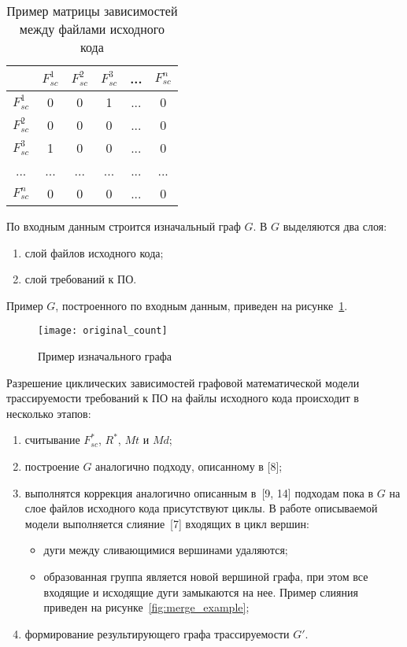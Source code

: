 \begin{longtable}{|c|c|c|c|c|c|}
\caption{Пример матрицы зависимостей между файлами исходного кода}
\label{tab:dependency_matrix}\\
\hline
& \cellcolor{platinum} $F_{sc}^1$ 
& \cellcolor{platinum} $F_{sc}^2$ 
& \cellcolor{platinum} $F_{sc}^3$ 
& ... 
& \cellcolor{platinum} $F_{sc}^n$ \\
\hline
\cellcolor{platinum} $F_{sc}^1$ & 0 & 0 & \cellcolor{light-blue} 1 & ... & 0 \\
\hline
\cellcolor{platinum} $F_{sc}^2$ & 0 & 0 & 0 & ... & 0 \\
\hline
\cellcolor{platinum} $F_{sc}^3$ & \cellcolor{mauve} 1 & 0 & 0 & ... & 0 \\
\hline
... & ... & ... & ... & ... & ... \\
\hline
\cellcolor{platinum} $F_{sc}^n $ & 0 & 0 & 0 & ... & 0 \\
\hline
\end{longtable}

По входным данным строится изначальный граф $G$. В $G$ выделяются два слоя:
\begin{enumerate}
    \item слой файлов исходного кода;
    \item слой требований к ПО.
\end{enumerate}

Пример $G$, построенного по входным данным, приведен на рисунке~\ref{fig:original_count}.

\begin{figure}[H]
    \centering
    \texttt{[image: original\_count]}
    \caption{Пример изначального графа}
    \label{fig:original_count}
\end{figure}

Разрешение циклических зависимостей графовой математической модели трассируемости требований к ПО на файлы исходного кода происходит в несколько этапов:
\begin{enumerate}
    \item считывание $F_{sc}^*$, $R^*$, $Mt$ и $Md$;
    \item построение $G$ аналогично подходу, описанному в [8];
    \item выполнятся коррекция аналогично описанным в~[9, 14] подходам пока в $G$ на слое файлов исходного кода присутствуют циклы. В работе описываемой модели выполняется слияние~[7] входящих в цикл вершин:
    \begin{itemize}
        \item дуги между сливающимися вершинами удаляются;
        \item образованная группа является новой вершиной графа, при этом все входящие и исходящие дуги замыкаются на нее. Пример слияния приведен на рисунке~\ref{fig:merge_example};
    \end{itemize}
    \item формирование результирующего графа трассируемости $G'$.
\end{enumerate}

